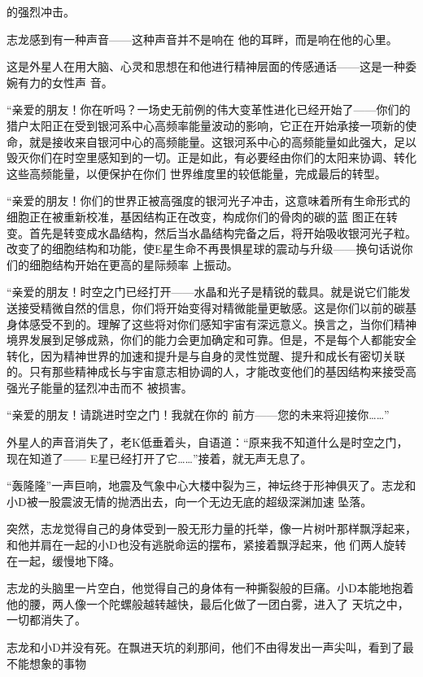 \documentclass{article}
\begin{document}
的强烈冲击。 

志龙感到有一种声音——这种声音并不是响在
他的耳畔，而是响在他的心里。 

这是外星人在用大脑、心灵和思想在和他进行精神层面的传感通话——这是一种委婉有力的女性声
音。 

“亲爱的朋友！你在听吗？一场史无前例的伟大变革性进化已经开始了——你们的猎户太阳正在受到银河系中心高频率能量波动的影响，它正在开始承接一项新的使命，就是接收来自银河中心的高频能量。这银河系中心的高频能量如此强大，足以毁灭你们在时空里感知到的一切。正是如此，有必要经由你们的太阳来协调、转化这些高频能量，以便保护在你们
世界维度里的较低能量，完成最后的转型。 

“亲爱的朋友！你们的世界正被高强度的银河光子冲击，这意味着所有生命形式的细胞正在被重新校准，基因结构正在改变，构成你们的骨肉的碳的蓝
\newpage
图正在转变。首先是转变成水晶结构，然后当水晶结构完备之后，将开始吸收银河光子粒。改变了的细胞结构和功能，使E星生命不再畏惧星球的震动与升级——换句话说你们的细胞结构开始在更高的星际频率
上振动。 

“亲爱的朋友！时空之门已经打开——水晶和光子是精锐的载具。就是说它们能发送接受精微自然的信息，你们将开始变得对精微能量更敏感。这是你们以前的碳基身体感受不到的。理解了这些将对你们感知宇宙有深远意义。换言之，当你们精神境界发展到足够成熟，你们的能力会更加确定和可靠。但是，不是每个人都能安全转化，因为精神世界的加速和提升是与自身的灵性觉醒、提升和成长有密切关联的。只有那些精神成长与宇宙意志相协调的人，才能改变他们的基因结构来接受高强光子能量的猛烈冲击而不
被损害。 

“亲爱的朋友！请跳进时空之门！我就在你的
前方——您的未来将迎接你……” 

\newpage

外星人的声音消失了，老K低垂着头，自语道：“原来我不知道什么是时空之门，现在知道了——
E星已经打开了它……”接着，就无声无息了。 

“轰隆隆”一声巨响，地震及气象中心大楼中裂为三，神坛终于形神俱灭了。志龙和小D被一股震波无情的抛洒出去，向一个无边无底的超级深渊加速
坠落。 

突然，志龙觉得自己的身体受到一股无形力量的托举，像一片树叶那样飘浮起来，和他并肩在一起的小D也没有逃脱命运的摆布，紧接着飘浮起来，他
们两人旋转在一起，缓慢地下降。 

志龙的头脑里一片空白，他觉得自己的身体有一种撕裂般的巨痛。小D本能地抱着他的腰，两人像一个陀螺般越转越快，最后化做了一团白雾，进入了
天坑之中，一切都消失了。 

志龙和小D并没有死。在飘进天坑的刹那间，他们不由得发出一声尖叫，看到了最不能想象的事物
\newpage
\end{document}
